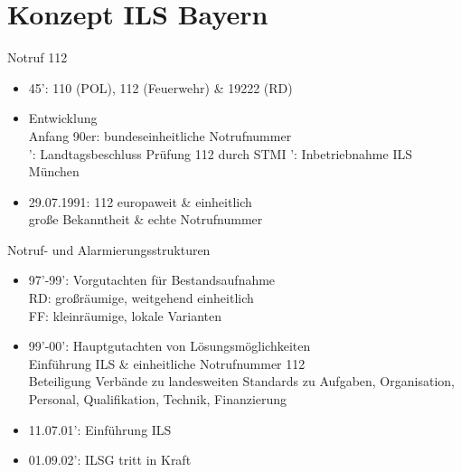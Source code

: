 \section{Konzept ILS Bayern}
\begin{sectionbox}{Notruf 112}
    \begin{itemize}
        \item 45': 110 (POL), 112 (Feuerwehr) \& 19222 (RD)
        \item Entwicklung\\
        \ra Anfang 90er: bundeseinheitliche Notrufnummer\\
        ': Landtagsbeschluss Prüfung 112 durch STMI
        ': Inbetriebnahme ILS München
        \item 29.07.1991: 112 europaweit \& einheitlich\\
        \ra große Bekanntheit \& echte Notrufnummer
    \end{itemize}
\end{sectionbox}
\begin{sectionbox}{Notruf- und Alarmierungsstrukturen}
    \begin{itemize}
        \item 97'-99': Vorgutachten für Bestandsaufnahme\\
        \ra RD: großräumige, weitgehend einheitlich\\
        \ra FF: kleinräumige, lokale Varianten
        \item 99'-00': Hauptgutachten von Lösungsmöglichkeiten\\
        \ra Einführung ILS \& einheitliche Notrufnummer 112\\
        \ra Beteiligung Verbände zu landesweiten Standards zu Aufgaben, Organisation, Personal, Qualifikation, Technik, Finanzierung
        \item 11.07.01': Einführung ILS
        \item 01.09.02': ILSG tritt in Kraft 
    \end{itemize}
\end{sectionbox}
